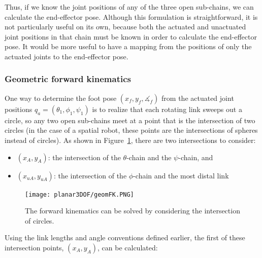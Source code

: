 \documentclass{report}
\begin{document}
Thus, if we know the joint positions of any of the three open sub-chains, we can calculate the end-effector pose. Although this formulation is straightforward, it is not particularly useful on its own, because both the actuated and unactuated joint positions in that chain must be known in order to calculate the end-effector pose. It would be more useful to have a mapping from the positions of only the actuated joints to the end-effector pose.

\subsubsection[Geometric forward kinematics]{Geometric forward kinematics}

One way to determine the foot pose $\left(x_{f},y_{f},\measuredangle_{f}\right)$ from the actuated joint positions $q_{a} = \left(\theta_{1}, \phi_{1}, \psi_{1} \right)$ is to realize that each rotating link sweeps out a circle, so any two open sub-chains meet at a point that is the intersection of two circles (in the case of a spatial robot, these points are the intersections of spheres instead of circles). As shown in Figure~\ref{fig:geomFK}, there are two intersections to consider:
\begin{itemize}
\item $\left(x_{A},y_{A}\right)$: the intersection of the $\theta$-chain and the $\psi$-chain, and
\item $\left(x_{uA},y_{uA}\right)$: the intersection of the $\phi$-chain and the most distal link
\end{itemize}

\begin{figure}[h!]
	\centering
	\texttt{[image: planar3DOF/geomFK.PNG]}
	\caption{The forward kinematics can be solved by considering the intersection of circles.}
	\label{fig:geomFK}
\end{figure}

Using the link lengths and angle conventions defined earlier, the first of these intersection points, $\left(x_{A},y_{A}\right)$, can be calculated:
\end{document}
